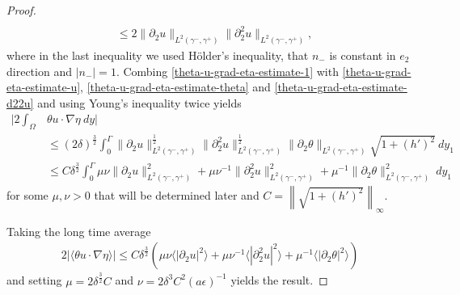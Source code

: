 \documentclass{article}
\theoremstyle{definition}
\theoremstyle{definition}
\begin{document}
\begin{proof}
\begin{equation}
\begin{aligned}
        \\
        &\leq 2 \|\partial_2 u\|_{L^2(\gamma^-,\gamma^+)}\|\partial_2^2 u\|_{L^2(\gamma^-,\gamma^+)},
    \end{aligned}
\end{equation}
where in the last inequality we used Hölder's inequality, that $n_-$ is constant in $e_2$ direction and $|n_-|=1$. Combing \eqref{theta-u-grad-eta-estimate-1} with \eqref{theta-u-grad-eta-estimate-u}, \eqref{theta-u-grad-eta-estimate-theta} and \eqref{theta-u-grad-eta-estimate-d22u} and using Young's inequality twice yields
\begin{align*}
    \bigg|2\int_\Omega &\theta u\cdot\nabla \eta\ dy\bigg|
    \\
    &\leq (2 \delta)^\frac{3}{2}\int_0^\Gamma \|\partial_2 u\|_{L^2(\gamma^-,\gamma^+)}^\frac{1}{2}\|\partial_2^2 u\|_{L^2(\gamma^-,\gamma^+)}^\frac{1}{2} \|\partial_2\theta\|_{L^2(\gamma^-,\gamma^+)}\sqrt{1+(h')^2}\ dy_1
    \\
    &\leq  C\delta^\frac{3}{2} \int_0^\Gamma\mu\nu\|\partial_2 u\|_{L^2(\gamma^-,\gamma^+)}^2+\mu\nu^{-1}\|\partial_2^2 u\|_{L^2(\gamma^-,\gamma^+)}^2 + \mu^{-1} \|\partial_2\theta\|_{L^2(\gamma^-,\gamma^+)}^2\ dy_1
\end{align*}
for some $\mu,\nu>0$ that will be determined later and $C=\left\|\sqrt{1+(h')^2}\right\|_{\infty}$.

Taking the long time average
\begin{align*}
    2|\langle\theta u\cdot \nabla \eta\rangle| \leq C\delta^\frac{3}{2} \left(\mu\nu \langle |\partial_2 u|^2\rangle + \mu \nu^{-1} \langle |\partial_2^2 u|^2\rangle +\mu^{-1}\langle |\partial_2 \theta|^2\rangle \right)
\end{align*}
and setting $\mu = 2\delta^\frac{3}{2}C$ and $\nu=2\delta^3 C^2 (a\epsilon)^{-1}$ yields the result.
\end{proof}
\end{document}
